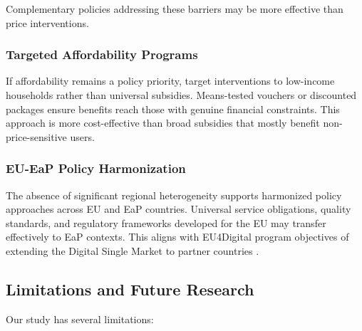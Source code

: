 \documentclass[12pt,review]{elsarticle}
\begin{document}
Complementary policies addressing these barriers may be more effective than price interventions.

\subsubsection{Targeted Affordability Programs}

If affordability remains a policy priority, target interventions to low-income households rather than universal subsidies. Means-tested vouchers or discounted packages ensure benefits reach those with genuine financial constraints. This approach is more cost-effective than broad subsidies that mostly benefit non-price-sensitive users.

\subsubsection{EU-EaP Policy Harmonization}

The absence of significant regional heterogeneity supports harmonized policy approaches across EU and EaP countries. Universal service obligations, quality standards, and regulatory frameworks developed for the EU may transfer effectively to EaP contexts. This aligns with EU4Digital program objectives of extending the Digital Single Market to partner countries \citep{ec2021eastern}.

\subsection{Limitations and Future Research}

Our study has several limitations:
\end{document}
